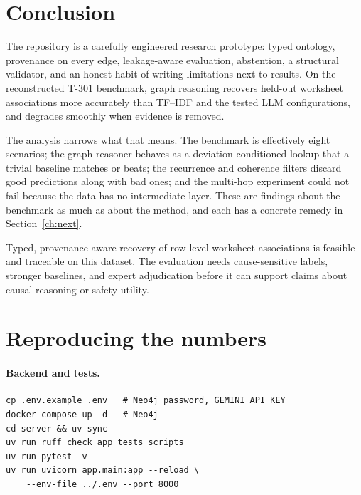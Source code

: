 \documentclass[10pt,twocolumn,a4paper]{extarticle}
\begin{document}
\section{Conclusion}\label{ch:conc}

The repository is a carefully engineered research prototype: typed ontology, provenance on every edge, leakage-aware evaluation, abstention, a structural validator, and an honest habit of writing limitations next to results. On the reconstructed T-301 benchmark, graph reasoning recovers held-out worksheet associations more accurately than TF--IDF and the tested LLM configurations, and degrades smoothly when evidence is removed.

The analysis narrows what that means. The benchmark is effectively eight scenarios; the graph reasoner behaves as a deviation-conditioned lookup that a trivial baseline matches or beats; the recurrence and coherence filters discard good predictions along with bad ones; and the multi-hop experiment could not fail because the data has no intermediate layer. These are findings about the benchmark as much as about the method, and each has a concrete remedy in Section~\ref{ch:next}.

\begin{finding}
Typed, provenance-aware recovery of row-level worksheet associations is feasible and traceable on this dataset. The evaluation needs cause-sensitive labels, stronger baselines, and expert adjudication before it can support claims about causal reasoning or safety utility.
\end{finding}

\appendix
\section{Reproducing the numbers}\label{app:repro}
\paragraph{Backend and tests.}
{\scriptsize
\begin{verbatim}
cp .env.example .env   # Neo4j password, GEMINI_API_KEY
docker compose up -d   # Neo4j
cd server && uv sync
uv run ruff check app tests scripts
uv run pytest -v
uv run uvicorn app.main:app --reload \
    --env-file ../.env --port 8000
\end{verbatim}}
\end{document}
